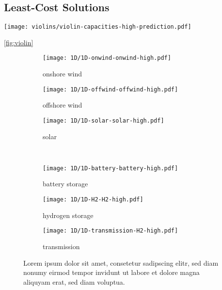 \subsection{Least-Cost Solutions}

\begin{SCfigure}
    \texttt{[image: violins/violin-capacities-high-prediction.pdf]}
    \caption{Lorem ipsum dolor sit amet, consetetur sadipscing elitr, sed diam nonumy eirmod tempor invidunt ut labore et dolore magna aliquyam erat, sed diam voluptua.}
    \label{fig:violin}
\end{SCfigure}

\cref{fig:violin}


\begin{figure}
    \begin{subfigure}[t]{0.32\textwidth}
        \caption{onshore wind}
        \texttt{[image: 1D/1D-onwind-onwind-high.pdf]}
    \end{subfigure}
    \begin{subfigure}[t]{0.32\textwidth}
        \caption{offshore wind}
        \texttt{[image: 1D/1D-offwind-offwind-high.pdf]}
    \end{subfigure}
    \begin{subfigure}[t]{0.32\textwidth}
        \caption{solar}
        \texttt{[image: 1D/1D-solar-solar-high.pdf]}
    \end{subfigure} \\
    \begin{subfigure}[t]{0.32\textwidth}
        \caption{battery storage}
        \texttt{[image: 1D/1D-battery-battery-high.pdf]}
    \end{subfigure}
    \begin{subfigure}[t]{0.32\textwidth}
        \caption{hydrogen storage}
        \texttt{[image: 1D/1D-H2-H2-high.pdf]}
    \end{subfigure}
    \begin{subfigure}[t]{0.32\textwidth}
        \caption{transmission}
        \texttt{[image: 1D/1D-transmission-H2-high.pdf]}
    \end{subfigure}
    \caption{Lorem ipsum dolor sit amet, consetetur sadipscing elitr, sed diam nonumy eirmod tempor invidunt ut labore et dolore magna aliquyam erat, sed diam voluptua.}
\end{figure}

